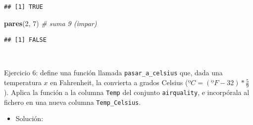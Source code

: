 \documentclass[11pt,]{book}
\newenvironment{Shaded}{\begin{snugshade}}{\end{snugshade}}
\newcommand{\CommentTok}[1]{\textcolor[rgb]{0.37,0.37,0.37}{\textit{#1}}}
\newcommand{\ControlFlowTok}[1]{\textcolor[rgb]{0.27,0.27,0.27}{\textbf{#1}}}
\newcommand{\DecValTok}[1]{\textcolor[rgb]{0.06,0.06,0.06}{#1}}
\newcommand{\KeywordTok}[1]{\textcolor[rgb]{0.27,0.27,0.27}{\textbf{#1}}}
\newcommand{\NormalTok}[1]{#1}
\newcommand{\OperatorTok}[1]{\textcolor[rgb]{0.43,0.43,0.43}{\textbf{#1}}}
\newcommand{\StringTok}[1]{\textcolor[rgb]{0.5,0.5,0.5}{#1}}
\providecommand{\tightlist}{%
  \setlength{\itemsep}{0pt}\setlength{\parskip}{0pt}}
\begin{document}
\begin{Shaded}
\end{Shaded}

\begin{verbatim}
## [1] TRUE
\end{verbatim}

\begin{Shaded}
\begin{Highlighting}[]
\KeywordTok{pares}\NormalTok{(}\DecValTok{2}\NormalTok{, }\DecValTok{7}\NormalTok{) }\CommentTok{# suma 9 (impar)}
\end{Highlighting}
\end{Shaded}

\begin{verbatim}
## [1] FALSE
\end{verbatim}

~

Ejercicio 6: define una función llamada \texttt{pasar\_a\_celsius} que, dada una temperatura \(x\) en Fahrenheit, la convierta a grados Celsius (\(ºC = (ºF - 32) * \frac{5}{9}\)). Aplica la función a la columna \texttt{Temp} del conjunto \texttt{airquality}, e incorpórala al fichero en una nueva columna \texttt{Temp\_Celsius}.

\begin{itemize}
\tightlist
\item
  Solución:
\end{itemize}
\end{document}
